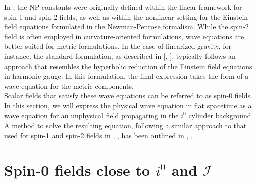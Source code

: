 In \cite{NewPen68}, the NP constants were originally defined within the linear framework for spin-1 and spin-2 fields, as well as within the nonlinear setting for the Einstein field equations formulated in the Newman-Penrose formalism.
While the spin-2 field is often employed in curvature-oriented formulations, wave equations are better suited for metric formulations. In the case of linearized gravity, for instance, the standard formulation, as described in [\cite{Mag07a}, \cite{Wal84a}], typically follows an approach that resembles the hyperbolic reduction of the Einstein field equations in harmonic gauge. In this formulation, the final expression takes the form of a wave equation for the metric components. \\

Scalar fields that satisfy these wave equations can be referred to as spin-0 fields. In this section, we will express the physical wave equation in flat spacetime as a wave equation for an unphysical field propagating in the $i^0$ cylinder background. A method to solve the resulting equation, following a similar approach to that used for spin-1 and spin-2 fields in \cite{Val07}, \cite{GasKro16d}, has been outlined in \cite{MinMacKro22}, \cite{GasPin23}.
\section{Spin-0 fields close to $i^0$ and $\mathscr{I}$}
\label{sec:Spin0FieldsCloseToI0AndI}

